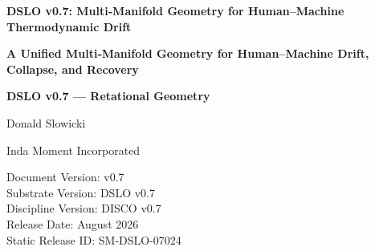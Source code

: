 \documentclass{article}
\begin{document}
\begin{titlepage}
\centering

{\Large\bfseries DSLO v0.7: Multi‑Manifold Geometry for Human–Machine Thermodynamic Drift\par}
\vspace{2em}
{\large\bfseries A Unified Multi‑Manifold Geometry for Human–Machine Drift, Collapse, and Recovery\par}
\vspace{1em}

{\Large\bfseries DSLO v0.7 --- Retational Geometry\par}

\vspace{2em}
{\large Donald Slowicki\par}
{\small Inda Moment Incorporated\par}

\vfill

{\small
Document Version: v0.7\\
Substrate Version: DSLO v0.7\\
Discipline Version: DISCO v0.7\\
Release Date: August 2026\\
Static Release ID: SM-DSLO-07024\\
}

\end{titlepage}

\end{document}
